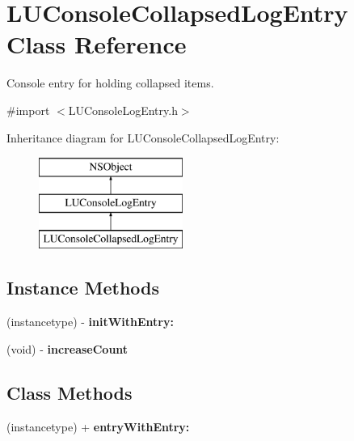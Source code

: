 \hypertarget{interface_l_u_console_collapsed_log_entry}{}\section{L\+U\+Console\+Collapsed\+Log\+Entry Class Reference}
\label{interface_l_u_console_collapsed_log_entry}


Console entry for holding collapsed items.  




{\ttfamily \#import $<$L\+U\+Console\+Log\+Entry.\+h$>$}

Inheritance diagram for L\+U\+Console\+Collapsed\+Log\+Entry\+:\begin{figure}[H]
\begin{center}
\leavevmode
\includegraphics[height=3.000000cm]{interface_l_u_console_collapsed_log_entry}
\end{center}
\end{figure}
\subsection*{Instance Methods}
\begin{DoxyCompactItemize}
\item 
\mbox{\label{interface_l_u_console_collapsed_log_entry_a64c54d7634189c71fc66094b64c8c1f4}} 
(instancetype) -\/ {\bfseries init\+With\+Entry\+:}
\item 
\mbox{\label{interface_l_u_console_collapsed_log_entry_afe6c4b92c34deed2703ed93a9d31bb96}} 
(void) -\/ {\bfseries increase\+Count}
\end{DoxyCompactItemize}
\subsection*{Class Methods}
\begin{DoxyCompactItemize}
\item 
\mbox{\label{interface_l_u_console_collapsed_log_entry_a3e155ded488cf746b8d078e57846b53b}} 
(instancetype) + {\bfseries entry\+With\+Entry\+:}
\end{DoxyCompactItemize}
